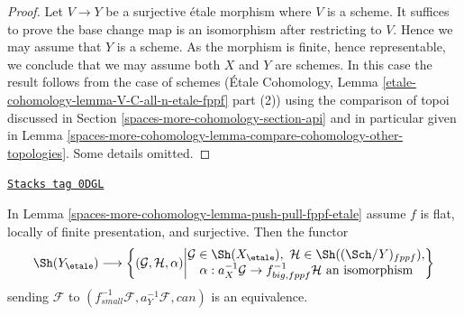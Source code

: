 \begin{proof}
Let $V \to Y$ be a surjective \'etale morphism where $V$ is a scheme.
It suffices to prove the base change map is an isomorphism after
restricting to $V$. Hence we may assume that $Y$ is a scheme.
As the morphism is finite, hence representable, we conclude
that we may assume both $X$ and $Y$ are schemes. In this case
the result follows from the case of schemes
(\'Etale Cohomology, Lemma \ref{etale-cohomology-lemma-V-C-all-n-etale-fppf}
part (2)) using the comparison of topoi discussed in
Section \ref{spaces-more-cohomology-section-api}
and in particular given in
Lemma \ref{spaces-more-cohomology-lemma-compare-cohomology-other-topologies}.
Some details omitted.
\end{proof}

\begin{lemma}
\label{spaces-more-cohomology-lemma-descent-sheaf-fppf-etale}
\href{https://stacks.math.columbia.edu/tag/0DGL}{\texttt{Stacks tag 0DGL}}

In Lemma \ref{spaces-more-cohomology-lemma-push-pull-fppf-etale} assume
$f$ is flat, locally of finite presentation, and surjective.
Then the functor
$$
\Sh(Y_\etale) \longrightarrow
\left\{
(\mathcal{G}, \mathcal{H}, \alpha)
\middle|
\begin{matrix}
\mathcal{G} \in \Sh(X_\etale),\ \mathcal{H} \in \Sh((\Sch/Y)_{fppf}), \\
\alpha : a_X^{-1}\mathcal{G} \to f_{big, fppf}^{-1}\mathcal{H}
\text{ an isomorphism}
\end{matrix}
\right\}
$$
sending $\mathcal{F}$ to
$(f_{small}^{-1}\mathcal{F}, a_Y^{-1}\mathcal{F}, can)$ is an equivalence.
\end{lemma}

